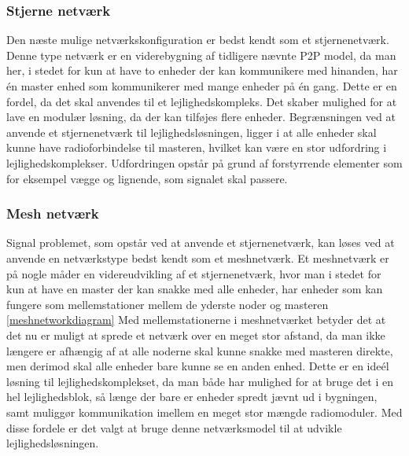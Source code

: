 \subsubsection*{Stjerne netværk}
Den næste mulige netværkskonfiguration  er bedst kendt som et stjernenetværk. Denne type netværk er en viderebygning af tidligere nævnte P2P model, da man her, i stedet for kun at have to enheder der kan kommunikere med hinanden, har én master enhed som kommunikerer med mange enheder på én gang. 
Dette er en fordel, da det skal anvendes til et lejlighedskompleks. Det skaber mulighed for at lave en modulær løsning, da der kan tilføjes flere enheder.
\newline
Begrænsningen ved at anvende et stjernenetværk til lejlighedsløsningen, ligger i at alle enheder skal kunne have radioforbindelse til masteren, hvilket kan være en stor udfordring i lejlighedskomplekser. Udfordringen opstår på grund af forstyrrende elementer som for eksempel vægge og lignende, som signalet skal passere.

\subsubsection*{Mesh netværk}
Signal problemet, som opstår ved at anvende et stjernenetværk, kan løses ved at anvende en netværkstype bedst kendt som et meshnetværk.
Et meshnetværk er på nogle måder en videreudvikling af et stjernenetværk, hvor man i stedet for kun at have en master der kan snakke med alle enheder, har enheder som kan fungere som mellemstationer mellem de yderste noder og masteren \ref{meshnetworkdiagram}
Med mellemstationerne i meshnetværket betyder det at det nu er muligt at sprede et netværk over en meget stor afstand, da man ikke længere er afhængig af at alle noderne skal kunne snakke med masteren direkte, men derimod skal alle enheder bare kunne se en anden enhed. Dette er en ideél løsning til lejlighedskomplekset, da man både har mulighed for at bruge det i en hel lejlighedsblok, så længe der bare er enheder spredt jævnt ud i bygningen, samt muliggør kommunikation imellem en meget stor mængde radiomoduler. Med disse fordele er det valgt at bruge denne netværksmodel til at udvikle lejlighedsløsningen.


